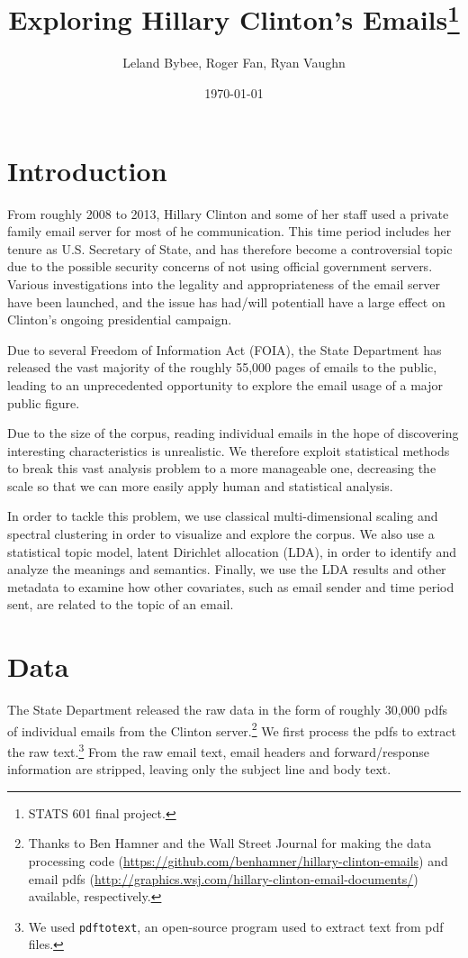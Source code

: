 \documentclass[12pt]{article}
\theoremstyle{definition}
\theoremstyle{algodesc}
\begin{document}
\title{Exploring Hillary Clinton's Emails\thanks{STATS 601 final project.}}
\author{
    Leland Bybee, Roger Fan, Ryan Vaughn
}
\date{\today}

\maketitle


\section{Introduction}
From roughly 2008 to 2013, Hillary Clinton and some of her staff used a private family email server for most of he communication. This time period includes her tenure as U.S. Secretary of State, and has therefore become a controversial topic due to the possible security concerns of not using official government servers. Various investigations into the legality and appropriateness of the email server have been launched, and the issue has had/will potentiall have a large effect on Clinton's ongoing presidential campaign.

Due to several Freedom of Information Act (FOIA), the State Department has released the vast majority of the roughly 55,000 pages of emails to the public, leading to an unprecedented opportunity to explore the email usage of a major public figure.

Due to the size of the corpus, reading individual emails in the hope of discovering interesting characteristics is unrealistic. We therefore exploit statistical methods to break this vast analysis problem to a more manageable one, decreasing the scale so that we can more easily apply human and statistical analysis.

In order to tackle this problem, we use classical multi-dimensional scaling and spectral clustering in order to visualize and explore the corpus. We also use a statistical topic model, latent Dirichlet allocation (LDA), in order to identify and analyze the meanings and semantics. Finally, we use the LDA results and other metadata to examine how other covariates, such as email sender and time period sent, are related to the topic of an email.


\section{Data}
The State Department released the raw data in the form of roughly 30,000 pdfs of individual emails from the Clinton server.\footnote{Thanks to Ben Hamner and the Wall Street Journal for making the data processing code (\url{https://github.com/benhamner/hillary-clinton-emails}) and email pdfs (\url{http://graphics.wsj.com/hillary-clinton-email-documents/}) available, respectively.} We first process the pdfs to extract the raw text.\footnote{We used \texttt{pdftotext}, an open-source program used to extract text from pdf files.} From the raw email text, email headers and forward/response information are stripped, leaving only the subject line and body text.
\end{document}
